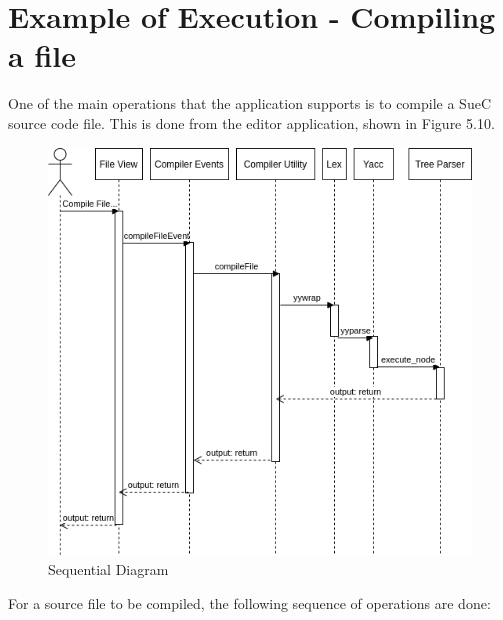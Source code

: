 \documentclass[12pt,a4paper,twoside]{report}
\begin{document}
\section{Example of Execution - Compiling a file}
One of the main operations that the application supports is to compile a SueC source code file. This is done from the editor application, shown in Figure 5.10.
\begin{figure}[H]
    \centering
    \includegraphics[width=0.8\linewidth]{img/diags/SeqDiag.png}
    \caption{Sequential Diagram}
    \label{fig:conf}
\end{figure}

For a source file to be compiled, the following sequence of operations are done:
\end{document}
